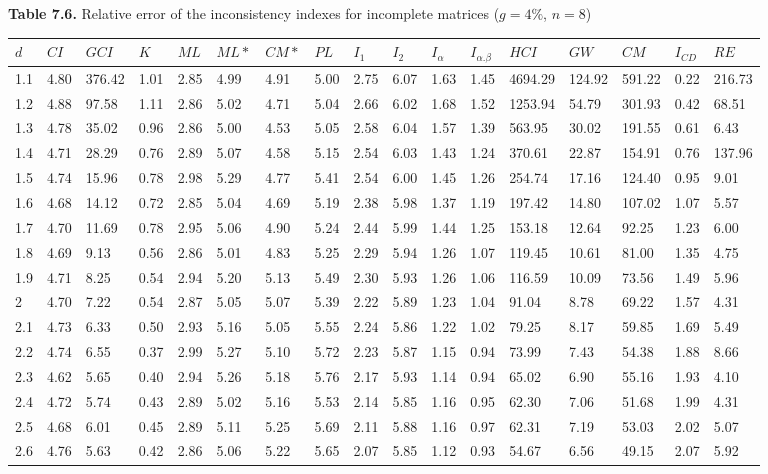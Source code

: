 \newpage
\textbf{Table 7.6.} Relative error of the inconsistency indexes for incomplete matrices ($g=4\%$, $n=8$)
\begin{adjustbox}{angle=90}
  \begin{center}
    \begin{tabular}{|l|llllllllllllllll|}
      \hline $d$ &
$CI$&$GCI$&$K$&$ML$&$ML*$&$CM*$&$PL$&$I_1$&$I_2$&$I_{\alpha}$&$I_{\alpha.\beta}$&$HCI$&$GW$&$CM$&$I_{CD}$&$RE$\\ \hline \hline
1.1&4.80&376.42&1.01&2.85&4.99&4.91&5.00&2.75&6.07&1.63&1.45&4694.29&124.92&591.22&0.22&216.73  \\ 
1.2&4.88&97.58&1.11&2.86&5.02&4.71&5.04&2.66&6.02&1.68&1.52&1253.94&54.79&301.93&0.42&68.51  \\ 
1.3&4.78&35.02&0.96&2.86&5.00&4.53&5.05&2.58&6.04&1.57&1.39&563.95&30.02&191.55&0.61&6.43  \\ 
1.4&4.71&28.29&0.76&2.89&5.07&4.58&5.15&2.54&6.03&1.43&1.24&370.61&22.87&154.91&0.76&137.96  \\ 
1.5&4.74&15.96&0.78&2.98&5.29&4.77&5.41&2.54&6.00&1.45&1.26&254.74&17.16&124.40&0.95&9.01  \\ 
1.6&4.68&14.12&0.72&2.85&5.04&4.69&5.19&2.38&5.98&1.37&1.19&197.42&14.80&107.02&1.07&5.57  \\ 
1.7&4.70&11.69&0.78&2.95&5.06&4.90&5.24&2.44&5.99&1.44&1.25&153.18&12.64&92.25&1.23&6.00  \\ 
1.8&4.69&9.13&0.56&2.86&5.01&4.83&5.25&2.29&5.94&1.26&1.07&119.45&10.61&81.00&1.35&4.75  \\ 
1.9&4.71&8.25&0.54&2.94&5.20&5.13&5.49&2.30&5.93&1.26&1.06&116.59&10.09&73.56&1.49&5.96  \\ 
2&4.70&7.22&0.54&2.87&5.05&5.07&5.39&2.22&5.89&1.23&1.04&91.04&8.78&69.22&1.57&4.31  \\ 
2.1&4.73&6.33&0.50&2.93&5.16&5.05&5.55&2.24&5.86&1.22&1.02&79.25&8.17&59.85&1.69&5.49  \\ 
2.2&4.74&6.55&0.37&2.99&5.27&5.10&5.72&2.23&5.87&1.15&0.94&73.99&7.43&54.38&1.88&8.66  \\ 
2.3&4.62&5.65&0.40&2.94&5.26&5.18&5.76&2.17&5.93&1.14&0.94&65.02&6.90&55.16&1.93&4.10  \\ 
2.4&4.72&5.74&0.43&2.89&5.02&5.16&5.53&2.14&5.85&1.16&0.95&62.30&7.06&51.68&1.99&4.31  \\ 
2.5&4.68&6.01&0.45&2.89&5.11&5.25&5.69&2.11&5.88&1.16&0.97&62.31&7.19&53.03&2.02&5.07  \\ 
2.6&4.76&5.63&0.42&2.86&5.06&5.22&5.65&2.07&5.85&1.12&0.93&54.67&6.56&49.15&2.07&5.92  \\ 

\end{tabular}
\end{center}
\end{adjustbox}
